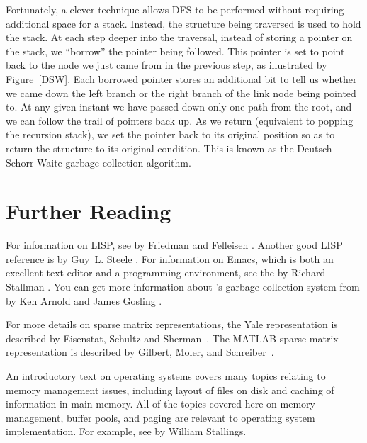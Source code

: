 Fortunately, a clever technique allows
DFS to be performed without requiring additional space for a stack.
Instead, the structure being traversed is used to hold the stack.
At each step deeper into the traversal, instead of storing a pointer
on the stack, we ``borrow'' the pointer being followed.
This pointer is set to point back to the node we just came from in
the previous step, as illustrated by Figure~\ref{DSW}.
Each borrowed pointer stores an additional bit to tell us whether we
came down the left branch or the right branch of the link node being
pointed to.
At any given instant we have passed down only one path from the
root, and we can follow the trail of pointers back up.
As we return (equivalent to popping the recursion stack), we set the
pointer back to its original position so as to return the
structure to its original condition.
This is known as the Deutsch-Schorr-Waite garbage
collection algorithm.

\section{Further Reading}

For information on LISP, see  by Friedman and
Felleisen \cite{LLISPer}.
Another good LISP reference is  by
Guy~L. Steele \cite{Steele}.
For information on Emacs,
which is both an excellent text editor and a
programming environment, see the 
by Richard Stallman \cite{EMACS}.
You can get more information about \LangJava's garbage collection system
from 
by Ken Arnold and James Gosling \cite{Arnold}.

For more details on sparse matrix representations, the Yale
representation is described by Eisenstat, Schultz and
Sherman~\cite{YaleSparse}.
The MATLAB sparse matrix representation is described by  Gilbert,
Moler, and Schreiber~\cite{MatlabSparse}.

An introductory text on operating systems
covers many topics relating
to memory management issues, including layout of files on disk and
caching of information in main memory.
All of the topics covered here on memory management, buffer pools, and
paging are relevant to operating system implementation.
For example, see  by
William Stallings\cite{Stallings}.

